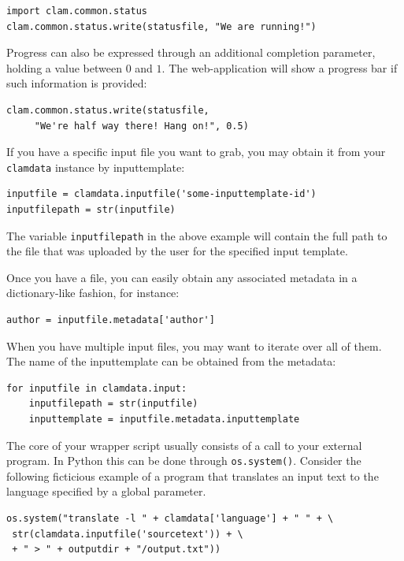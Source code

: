 \documentclass[a4paper,12pt,twoside,openright]{report}
\begin{document}
{ \small
\begin{verbatim}
import clam.common.status
clam.common.status.write(statusfile, "We are running!")
\end{verbatim}
}

Progress can also be expressed through an additional completion parameter,
holding a value between $0$ and $1$. The web-application will show a progress bar if
such information is provided:

{ \small
\begin{verbatim}
clam.common.status.write(statusfile, 
     "We're half way there! Hang on!", 0.5)
\end{verbatim}
}

If you have a specific input file you want to grab, you may obtain it from your
\texttt{clamdata} instance by inputtemplate:

{ \small
\begin{verbatim}
inputfile = clamdata.inputfile('some-inputtemplate-id')
inputfilepath = str(inputfile) 
\end{verbatim}
}

The variable \texttt{inputfilepath} in the above example will contain the full
path to the file that was uploaded by the user for the specified input
template. 

Once you have a file, you can easily obtain any associated metadata in a
dictionary-like fashion, for instance:

{ \small
\begin{verbatim}
author = inputfile.metadata['author']
\end{verbatim}
}

When you have multiple input files, you may want to iterate over all of them.
The name of the inputtemplate can be obtained from the metadata:

{ \small
\begin{verbatim}
for inputfile in clamdata.input:
    inputfilepath = str(inputfile)
    inputtemplate = inputfile.metadata.inputtemplate
\end{verbatim}
}
  
The core of your wrapper script usually consists of a call to your external
program. In Python this can be done through \texttt{os.system()}. Consider the
following ficticious example of a program that translates an input text to the
language specified by a global parameter.

{ \small
\begin{verbatim}
os.system("translate -l " + clamdata['language'] + " " + \
 str(clamdata.inputfile('sourcetext')) + \
 + " > " + outputdir + "/output.txt"))
\end{verbatim}
}
\end{document}
